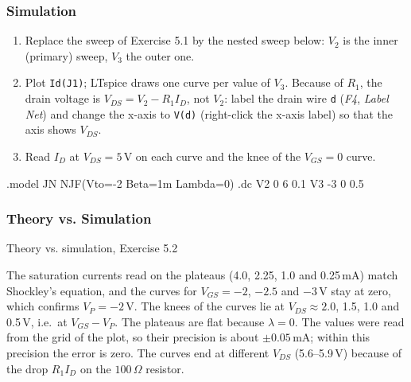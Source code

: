 \subsubsection*{Simulation}
\begin{enumerate}[itemsep=2pt]
  \item Replace the sweep of Exercise 5.1 by the nested sweep below: $V_2$ is the inner (primary) sweep, $V_3$ the outer one.
  \item Plot \texttt{Id(J1)}; LTspice draws one curve per value of $V_3$. Because of $R_1$, the drain voltage is
        $V_{DS} = V_2 - R_1 I_D$, not $V_2$: label the drain wire \texttt{d} (\textit{F4}, \textit{Label Net}) and change the x-axis to \texttt{V(d)}
        (right-click the x-axis label) so that the axis shows $V_{DS}$.
  \item Read $I_D$ at $V_{DS} = 5$\,V on each curve and the knee of the $V_{GS}=0$ curve.
\end{enumerate}
\begin{spice}
.model JN NJF(Vto=-2 Beta=1m Lambda=0)
.dc V2 0 6 0.1 V3 -3 0 0.5
\end{spice}

\subsubsection*{Theory vs. Simulation}
\begin{comparison}{Theory vs. simulation, Exercise 5.2}
\end{comparison}
\begin{solution}
The saturation currents read on the plateaus (4.0, 2.25, 1.0 and 0.25\,mA) match Shockley's equation, and the
curves for $V_{GS} = -2$, $-2.5$ and $-3$\,V stay at zero, which confirms $V_P = -2$\,V. The knees of the curves lie at
$V_{DS} \approx 2.0$, 1.5, 1.0 and 0.5\,V, i.e.\ at $V_{GS} - V_P$. The plateaus are flat because $\lambda = 0$. The values were read
from the grid of the plot, so their precision is about $\pm0.05$\,mA; within this precision the error is zero. The curves end at
different $V_{DS}$ (5.6--5.9\,V) because of the drop $R_1 I_D$ on the $100\,\Omega$ resistor.
\end{solution}
